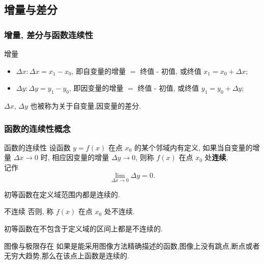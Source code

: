 \documentclass[
10pt,
aspectratio=43,
]{beamer}
\begin{document}
\subsection{增量与差分}
\begin{frame}
	\frametitle{增量, 差分与函数连续性}
	\begin{block}{增量}
		\begin{itemize}
			\item $\Delta x: \Delta x=x_1-x_0$, 即自变量的增量 $=$ 终值 - 初值, 或终值 $x_1=x_0+\Delta x$;
			\item $\Delta y: \Delta y=y_1-y_0$, 即因变量的增量 $=$ 终值 - 初值, 或终值 $y_1=y_0+\Delta y$;
		\end{itemize}
		$\Delta x$, $\Delta y$ 也被称为关于自变量,因变量的差分.
	\end{block}
\end{frame}

\begin{frame}
	\frametitle{函数的连续性概念}
	\begin{block}{函数的连续性}
		设函数 $y=f(x)$ 在点 $x_0$ 的某个邻域内有定义, 如果当自变量的增量 $\Delta x \rightarrow 0$ 时, 相应因变量的增量 $\Delta y \rightarrow 0$, 则称 $f(x)$ 在点 $x_0$ 处\textbf{连续},\\
		记作 $$\lim _{\Delta x \rightarrow 0} \Delta y=0.$$
	\end{block}
	\pause
	初等函数在定义域范围内都是连续的.
	\pause
	\begin{exampleblock}{不连续}
		否则, 称 $f(x)$ 在点 $x_0$ 处不连续.
	\end{exampleblock}
	\pause
	初等函数在不包含于定义域的区间上都是不连续的.
	\begin{alertblock}{图像与极限存在}
		如果是能采用图像方法精确描述的函数,图像上没有跳点,断点或者无穷大趋势,那么在该点上函数是连续的.
	\end{alertblock}
\end{frame}
\end{document}
